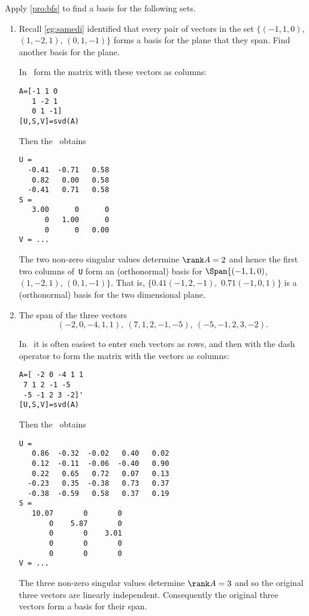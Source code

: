 \begin{example} \label{eg:}
Apply \autoref{pro:bfs} to find a basis for the following sets.
\begin{enumerate}
\item Recall \autoref{eg:samedi} identified that every pair of vectors in the set \(\{(-1,1,0)\), \((1,-2,1)\), \((0,1,-1)\}\) forms a basis for the plane that they span.  
Find another basis for the plane.
\begin{solution} 
In \script\ form the matrix with these vectors as columns:
\begin{verbatim}
A=[-1 1 0
   1 -2 1
   0 1 -1]
[U,S,V]=svd(A)
\end{verbatim}
\setbox\ajrqrbox\hbox{}%
\marginpar{\usebox{\ajrqrbox}}%
Then the \svd\  obtains \twodp
\begin{verbatim}
U =
  -0.41  -0.71   0.58
   0.82   0.00   0.58
  -0.41   0.71   0.58
S =
   3.00      0      0
      0   1.00      0
      0      0   0.00
V = ...
\end{verbatim}
The two non-zero singular values determine \(\rank A=2\) and hence the first two columns of~\verb|U| form an (orthonormal) basis for \(\Span\{(-1,1,0)\), \((1,-2,1)\), \((0,1,-1)\}\).
That is, \(\{0.41(-1,2,-1),\) \(0.71(-1,0,1)\}\) is a (orthonormal) basis for the two dimensional plane.
\end{solution}

\item The span of the three vectors
\begin{equation*}
(-2,0,-4,1,1),\ 
(7,1,2,-1,-5),\ 
(-5,-1,2,3,-2).
\end{equation*}
\begin{solution} 
In \script\ it is often easiest to enter such vectors as rows, and then  with the dash operator to form the matrix with the vectors as columns:
\begin{verbatim}
A=[ -2 0 -4 1 1
 7 1 2 -1 -5
 -5 -1 2 3 -2]'
[U,S,V]=svd(A)
\end{verbatim}
\setbox\ajrqrbox\hbox{}%
\marginpar{\usebox{\ajrqrbox}}%
Then the \svd\ obtains \twodp
\begin{verbatim}
U =
   0.86  -0.32  -0.02   0.40   0.02
   0.12  -0.11  -0.06  -0.40   0.90
   0.22   0.65   0.72   0.07   0.13
  -0.23   0.35  -0.38   0.73   0.37
  -0.38  -0.59   0.58   0.37   0.19
S =
   10.07       0       0
       0    5.87       0
       0       0    3.01
       0       0       0
       0       0       0
V = ...
\end{verbatim}
The three non-zero singular values determine  \(\rank A=3\) and so the original three vectors are linearly independent.
Consequently the original three vectors form a basis for their span.


\end{solution}
\end{enumerate}
\end{example}
